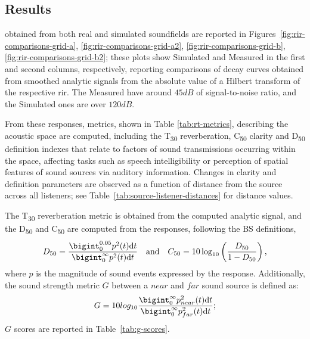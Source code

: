 \subsection{Results}






 obtained from both real and simulated soundfields are reported in Figures~\ref{fig:rir-comparisons-grid-a}, \ref{fig:rir-comparisons-grid-a2}, \ref{fig:rir-comparisons-grid-b}, \ref{fig:rir-comparisons-grid-b2}; these plots show Simulated and Measured  in the first and second columns, respectively, reporting comparisons of decay curves obtained from smoothed analytic signals from the absolute value of a Hilbert transform of the respective \acrshort{rir}. The Measured  have around $45dB$ of signal-to-noise ratio, and the Simulated ones are over $120dB$. \par
From these responses, metrics, shown in Table \ref{tab:rt-metrics}, describing the acoustic space are computed, including the T\textsubscript{30} reverberation, C\textsubscript{50} clarity and D\textsubscript{50} definition indexes that relate to factors of sound transmissions occurring within the space, affecting tasks such as speech intelligibility or perception of spatial features of sound sources via auditory information. Changes in clarity and definition parameters are observed as a function of distance from the source across all listeners; see Table~\ref{tab:source-listener-distances} for distance values. \par
The T\textsubscript{30} reverberation metric is obtained from the computed analytic signal, and the D\textsubscript{50} and C\textsubscript{50} are computed from the responses, following the BS \cite{bs3382-1} definitions,
\begin{equation}
    D_{50} = \frac{\bigint_{0}^{0.05} p^2(t)\textrm{d}t}{\bigint_{0}^{\infty} p^2(t)\textrm{d}t}\quad \textrm{and} \quad C_{50} = 10\log_{10} \left( \frac{D_{50}}{1-D_{50}} \right)\textrm{,}
\end{equation}
where $p$ is the magnitude of sound events expressed by the response. Additionally, the sound strength metric $G$ between a $near$ and $far$ sound source is defined as:
\begin{equation}
    G = 10 log_{10} \frac{\bigint_{0}^{\infty} p_{near}^2(t)\textrm{d}t}{\bigint_{0}^{\infty} p_{far}^2(t)\textrm{d}t} \textrm{;}
\end{equation}
$G$ scores are reported in Table~\ref{tab:g-scores}.


